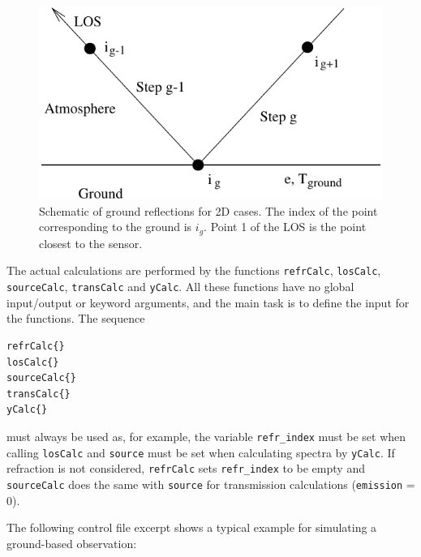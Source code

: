   \begin{figure}
   \begin{center}
     \includegraphics*[width=0.75\hsize]{Figs/ground}
    \caption{Schematic of ground reflections for 2D cases. The index 
             of the point corresponding to the ground is $i_g$. Point 1
             of the LOS is the point closest to the sensor. }  
    \label{fig:los1d:ground}  
   \end{center}
  \end{figure}
 


 \label{sec:los:cfe}
 
 The actual calculations are performed by the functions
 \verb|refrCalc|, \verb|losCalc|, \verb|sourceCalc|, \verb|transCalc|
 and \verb|yCalc|. All these functions have no global input/output or
 keyword arguments, and the main task is to define the input for the
 functions. The sequence {\footnotesize \begin{verbatim}
refrCalc{}
losCalc{}
sourceCalc{}
transCalc{}
yCalc{} 
\end{verbatim} 
} 
\noindent 
must always be used as, for example, the variable \verb|refr_index|
must be set when calling \verb|losCalc| and \verb|source|
must be set when calculating spectra by \verb|yCalc|. If refraction
is not considered, \verb|refrCalc| sets \verb|refr_index| to be empty
and \verb|sourceCalc| does the same with \verb|source| for transmission
calculations (\verb|emission| = 0).



 The following control file excerpt shows a typical example for
 simulating a ground-based observation:

